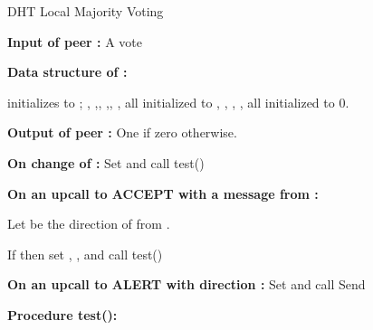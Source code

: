 \documentclass[12pt,english,journal]{elsarticle}
\numberwithin{equation}{section}
\numberwithin{figure}{section}
\theoremstyle{plain}
\theoremstyle{plain}
\begin{document}
\begin{algorithm}
\caption{\label{alg:DHT-Majority-Voting}DHT Local Majority Voting}


\noindent \begin{raggedright}
\textbf{Input of peer : }A vote 
\par\end{raggedright}

\noindent \begin{raggedright}
\textbf{Data structure of :}
\par\end{raggedright}

\noindent \begin{raggedright}
 initializes to ; ,
,, ,, , all
initialized to , , , ,
 all initialized to 0.
\par\end{raggedright}

\noindent \begin{raggedright}
\textbf{Output of peer :} One if 
zero otherwise.
\par\end{raggedright}

\noindent \begin{raggedright}
\textbf{On change of : }Set 
and call test()
\par\end{raggedright}

\noindent \begin{raggedright}
\textbf{On an upcall to ACCEPT with a message 
from :}
\par\end{raggedright}

\noindent \begin{raggedright}
Let  be the direction of 
from .
\par\end{raggedright}

\noindent \begin{raggedright}
If  then set , ,
and call test()
\par\end{raggedright}

\noindent \begin{raggedright}
\textbf{On an upcall to ALERT with direction :} Set 
and call Send
\par\end{raggedright}

\noindent \begin{raggedright}
\textbf{Procedure test():}
\par\end{raggedright}


\end{algorithm}
\end{document}
